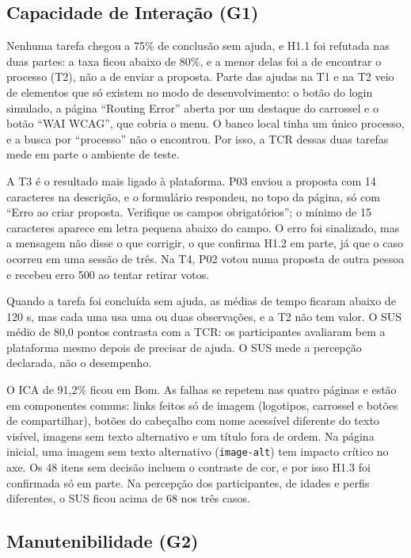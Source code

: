 \documentclass[journal]{IEEEtran}
\begin{document}
\subsection{Capacidade de Interação (G1)}
\label{sec:res_g1}

Nenhuma tarefa chegou a 75\% de conclusão sem ajuda, e H1.1 foi refutada nas duas partes: a taxa ficou abaixo de 80\%, e a menor delas foi a de encontrar o processo (T2), não a de enviar a proposta. Parte das ajudas na T1 e na T2 veio de elementos que só existem no modo de desenvolvimento: o botão do login simulado, a página ``Routing Error'' aberta por um destaque do carrossel e o botão ``WAI WCAG'', que cobria o menu. O banco local tinha um único processo, e a busca por ``processo'' não o encontrou. Por isso, a TCR dessas duas tarefas mede em parte o ambiente de teste.

A T3 é o resultado mais ligado à plataforma. P03 enviou a proposta com 14 caracteres na descrição, e o formulário respondeu, no topo da página, só com ``Erro ao criar proposta. Verifique os campos obrigatórios''; o mínimo de 15 caracteres aparece em letra pequena abaixo do campo. O erro foi sinalizado, mas a mensagem não disse o que corrigir, o que confirma H1.2 em parte, já que o caso ocorreu em uma sessão de três. Na T4, P02 votou numa proposta de outra pessoa e recebeu erro 500 ao tentar retirar votos.

Quando a tarefa foi concluída sem ajuda, as médias de tempo ficaram abaixo de 120 s, mas cada uma usa uma ou duas observações, e a T2 não tem valor. O SUS médio de 80,0 pontos contrasta com a TCR: os participantes avaliaram bem a plataforma mesmo depois de precisar de ajuda. O SUS mede a percepção declarada, não o desempenho.

O ICA de 91,2\% ficou em Bom. As falhas se repetem nas quatro páginas e estão em componentes comuns: links feitos só de imagem (logotipos, carrossel e botões de compartilhar), botões do cabeçalho com nome acessível diferente do texto visível, imagens sem texto alternativo e um título fora de ordem. Na página inicial, uma imagem sem texto alternativo (\texttt{image-alt}) tem impacto crítico no axe. Os 48 itens sem decisão incluem o contraste de cor, e por isso H1.3 foi confirmada só em parte. Na percepção dos participantes, de idades e perfis diferentes, o SUS ficou acima de 68 nos três casos.

\subsection{Manutenibilidade (G2)}
\label{sec:res_g2}
\end{document}
